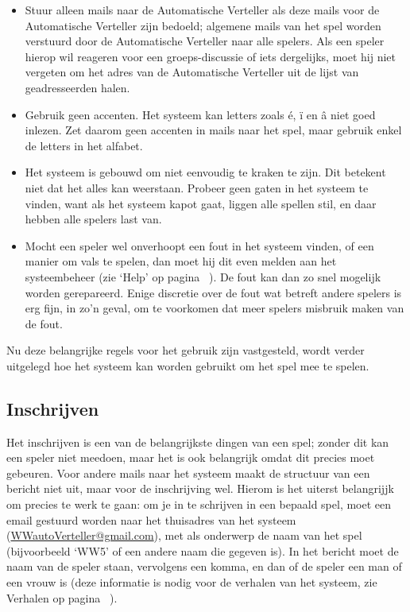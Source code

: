 \documentclass[12pt]{article}
\begin{document}
  \begin{itemize}
    \item Stuur alleen mails naar de Automatische Verteller als deze mails voor de Automatische Verteller zijn bedoeld; algemene mails van het spel worden verstuurd door de Automatische Verteller naar alle spelers. Als een speler hierop wil reageren voor een groeps-discussie of iets dergelijks, moet hij niet vergeten om het adres van de Automatische Verteller uit de lijst van geadresseerden halen.
    \item Gebruik geen accenten. Het systeem kan letters zoals \'e, \"i en \^a niet goed inlezen. Zet daarom geen accenten in mails naar het spel, maar gebruik enkel de letters in het alfabet.
    \item Het systeem is gebouwd om niet eenvoudig te kraken te zijn. Dit betekent niet dat het alles kan weerstaan. Probeer geen gaten in het systeem te vinden, want als het systeem kapot gaat, liggen alle spellen stil, en daar hebben alle spelers last van.
    \item Mocht een speler wel onverhoopt een fout in het systeem vinden, of een manier om vals te spelen, dan moet hij dit even melden aan het systeembeheer (zie `Help' op pagina~\pageref{subsec:help} ). De fout kan dan zo snel mogelijk worden gerepareerd. Enige discretie over de fout wat betreft andere spelers is erg fijn, in zo'n geval, om te voorkomen dat meer spelers misbruik maken van de fout.
  \end{itemize}
  
  Nu deze belangrijke regels voor het gebruik zijn vastgesteld, wordt verder uitgelegd hoe het systeem kan worden gebruikt om het spel mee te spelen.

  \subsection{Inschrijven}
  
    Het inschrijven is een van de belangrijkste dingen van een spel; zonder dit kan een speler niet meedoen, maar het is ook belangrijk omdat dit precies moet gebeuren. Voor andere mails naar het systeem maakt de structuur van een bericht niet uit, maar voor de inschrijving wel. Hierom is het uiterst belangrijjk om precies te werk te gaan: om je in te schrijven in een bepaald spel, moet een email gestuurd worden naar het thuisadres van het systeem (\href{mailto:<WWautoVerteller@gmail.com>}{WWautoVerteller@gmail.com}), met als onderwerp de naam van het spel (bijvoorbeeld `WW5' of een andere naam die gegeven is). In het bericht moet de naam van de speler staan, vervolgens een komma, en dan of de speler een man of een vrouw is (deze informatie is nodig voor de verhalen van het systeem, zie Verhalen op pagina~\pageref{subsec:verhalen} ).
    
\end{document}
